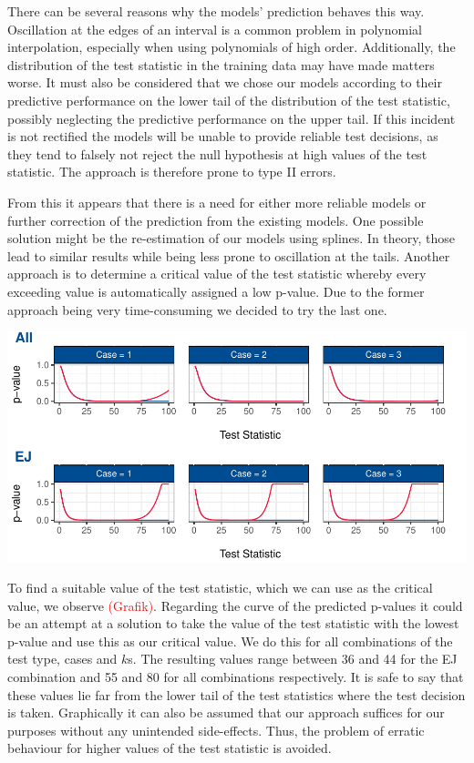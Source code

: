 \documentclass[12pt,a4paper]{article}
\let\origfigure\figure
\let\endorigfigure\endfigure
\renewenvironment{figure}[1][2] {
    \expandafter\origfigure\expandafter[H]
} {
    \endorigfigure
}
\begin{document}
There can be several reasons why the models' prediction behaves this
way. Oscillation at the edges of an interval is a common problem in
polynomial interpolation, especially when using polynomials of high
order. Additionally, the distribution of the test statistic in the
training data may have made matters worse. It must also be considered
that we chose our models according to their predictive performance on
the lower tail of the distribution of the test statistic, possibly
neglecting the predictive performance on the upper tail. If this
incident is not rectified the models will be unable to provide reliable
test decisions, as they tend to falsely not reject the null hypothesis
at high values of the test statistic. The approach is therefore prone to
type II errors.

From this it appears that there is a need for either more reliable
models or further correction of the prediction from the existing models.
One possible solution might be the re-estimation of our models using
splines. In theory, those lead to similar results while being less prone
to oscillation at the tails. Another approach is to determine a critical
value of the test statistic whereby every exceeding value is
automatically assigned a low p-value. Due to the former approach being
very time-consuming we decided to try the last one.

\begin{figure}
\centering
\includegraphics{p_approx_paper_files/figure-latex/p_stat__k.2-1.pdf}
\caption{\label{fig:e_j_k.1} Corrected (blue) and uncorrected (red)
\(p\)-value predictions for all cases and K = 1, using Engle-Granger and
Johansen and all as underlying tests.}
\end{figure}

To find a suitable value of the test statistic, which we can use as the
critical value, we observe \textcolor{red}{(Grafik)}. Regarding the
curve of the predicted p-values it could be an attempt at a solution to
take the value of the test statistic with the lowest p-value and use
this as our critical value. We do this for all combinations of the test
type, cases and \(k\)s. The resulting values range between 36 and 44 for
the EJ combination and 55 and 80 for all combinations respectively. It
is safe to say that these values lie far from the lower tail of the test
statistics where the test decision is taken. Graphically it can also be
assumed that our approach suffices for our purposes without any
unintended side-effects. Thus, the problem of erratic behaviour for
higher values of the test statistic is avoided.
\end{document}
